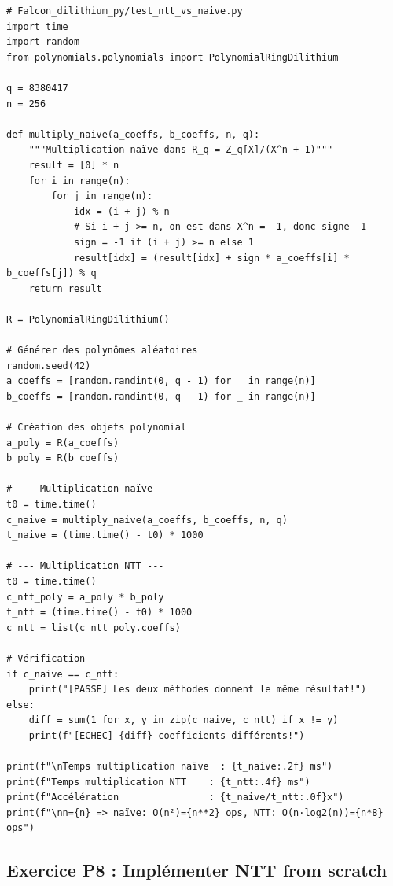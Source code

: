 \documentclass[12pt, a4paper]{article}
\begin{document}
\begin{solution}
\begin{lstlisting}[style=python]
# Falcon_dilithium_py/test_ntt_vs_naive.py
import time
import random
from polynomials.polynomials import PolynomialRingDilithium

q = 8380417
n = 256

def multiply_naive(a_coeffs, b_coeffs, n, q):
    """Multiplication naïve dans R_q = Z_q[X]/(X^n + 1)"""
    result = [0] * n
    for i in range(n):
        for j in range(n):
            idx = (i + j) % n
            # Si i + j >= n, on est dans X^n = -1, donc signe -1
            sign = -1 if (i + j) >= n else 1
            result[idx] = (result[idx] + sign * a_coeffs[i] * b_coeffs[j]) % q
    return result

R = PolynomialRingDilithium()

# Générer des polynômes aléatoires
random.seed(42)
a_coeffs = [random.randint(0, q - 1) for _ in range(n)]
b_coeffs = [random.randint(0, q - 1) for _ in range(n)]

# Création des objets polynomial
a_poly = R(a_coeffs)
b_poly = R(b_coeffs)

# --- Multiplication naïve ---
t0 = time.time()
c_naive = multiply_naive(a_coeffs, b_coeffs, n, q)
t_naive = (time.time() - t0) * 1000

# --- Multiplication NTT ---
t0 = time.time()
c_ntt_poly = a_poly * b_poly
t_ntt = (time.time() - t0) * 1000
c_ntt = list(c_ntt_poly.coeffs)

# Vérification
if c_naive == c_ntt:
    print("[PASSE] Les deux méthodes donnent le même résultat!")
else:
    diff = sum(1 for x, y in zip(c_naive, c_ntt) if x != y)
    print(f"[ECHEC] {diff} coefficients différents!")

print(f"\nTemps multiplication naïve  : {t_naive:.2f} ms")
print(f"Temps multiplication NTT    : {t_ntt:.4f} ms")
print(f"Accélération                : {t_naive/t_ntt:.0f}x")
print(f"\nn={n} => naïve: O(n²)={n**2} ops, NTT: O(n·log2(n))={n*8} ops")
\end{lstlisting}
\end{solution}

\subsection{Exercice P8 : Implémenter NTT from scratch}
\end{document}
